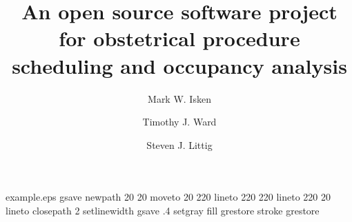 %
%
%
%
%
\begin{filecontents*}{example.eps}
gsave
newpath
  20 20 moveto
  20 220 lineto
  220 220 lineto
  220 20 lineto
closepath
2 setlinewidth
gsave
  .4 setgray fill
grestore
stroke
grestore
\end{filecontents*}
%
\documentclass{svjour3}                     %
%
\smartqed  %
%
\usepackage{graphicx}
%
\usepackage{mathptmx}      %
%
\usepackage{amsmath, amssymb}
%
\newcommand{\nipar}{\par\noindent\ignorespaces}

%
%


\title{An open source software project for obstetrical procedure scheduling and occupancy analysis%
}


\author{Mark W. Isken         \and
        Timothy J. Ward         \and
        Steven J. Littig         \and
}

